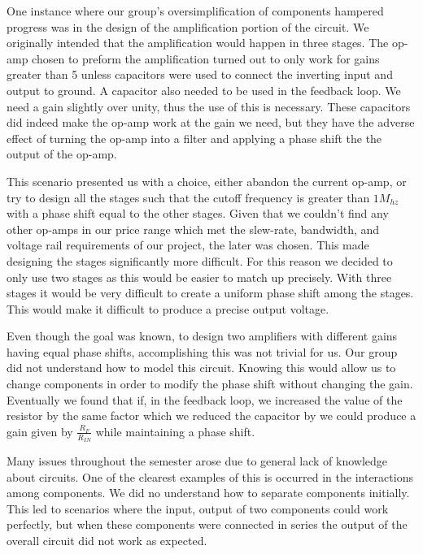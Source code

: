 \documentclass{article}	%
\begin{document}
\begin{multicols}{2}
One instance where our group's oversimplification of
components hampered progress was in the design of the
amplification portion of the circuit.
We originally intended that the amplification 
would happen in three stages.
The op-amp chosen to preform the amplification turned
out to only work for gains greater than 5 unless
capacitors were used to connect the inverting input and output to ground.
A capacitor also needed to be used in the feedback loop.
We need a gain slightly over unity,
thus the use of this is necessary.
These capacitors did indeed make the op-amp work at the gain we need, but
they have the adverse effect of turning the op-amp into a filter and
applying a phase shift the the output of the op-amp.

This scenario presented us with a choice,
either abandon the current op-amp, or
try to design all the stages such that 
the cutoff frequency is greater than $1M_{hz}$
with a phase shift equal to the other stages.
Given that we couldn't find any other op-amps 
in our price range which met the slew-rate, bandwidth,
and voltage rail requirements of our project,
the later was chosen.
This made designing the stages significantly more difficult.
For this reason we decided to only use two stages as
this would be easier to match up precisely.
With three stages it would be very difficult to 
create a uniform phase shift among the stages.
This would make it difficult to produce a precise output voltage.

Even though the goal was known,
to design two amplifiers with different gains 
having equal phase shifts,
accomplishing this was not trivial for us.
Our group did not understand how to model this circuit.
Knowing this would allow us to change components in
order to modify the phase shift without changing the gain.
Eventually we found that if, in the feedback loop,
we increased the value of the resistor by the same
factor which we reduced the capacitor by we could
produce a gain given by $\frac{R_F}{R_{IN}}$
while maintaining a phase shift.

Many issues throughout the semester arose 
due to general lack of knowledge about circuits.
One of the clearest examples of this is occurred
in the interactions among components.
We did no understand how to separate
components initially.
This led to scenarios where the input, output of 
two components could work perfectly, but 
when these components were connected in
series the output of the overall
circuit did not work as expected.


\end{multicols}
\end{document}
